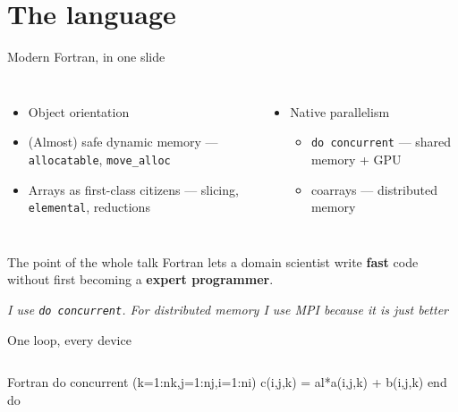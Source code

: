 \documentclass[aspectratio=169]{beamer}
\begin{document}
\section{The language}

\begin{frame}{Modern Fortran, in one slide}
  \begin{columns}[T,onlytextwidth]
      \begin{itemize}
        \item Object orientation 
        \item (Almost) safe dynamic memory --- \texttt{allocatable}, \texttt{move\_alloc}
        \item Arrays as first-class citizens --- slicing, \texttt{elemental}, reductions
      \end{itemize}
      \begin{itemize}
        \item Native parallelism 
          \begin{itemize}
            \item \texttt{do concurrent} --- shared memory + GPU
            \item coarrays --- distributed memory
          \end{itemize}
      \end{itemize}
  \end{columns}
  \vfill
  \begin{exampleblock}{The point of the whole talk}
    Fortran lets a domain scientist write \textbf{fast} code without first becoming a
    \textbf{expert programmer}.
  \end{exampleblock}
  \vspace{.2em}
  {\footnotesize\itshape I use \texttt{do concurrent}. For distributed memory I use MPI because it is just better}
\end{frame}

\begin{frame}[fragile]{One loop, every device}
  \begin{columns}[T,onlytextwidth]
      \begin{cookiecode}[title=Standard Fortran]{Fortran}
do concurrent (k=1:nk,j=1:nj,i=1:ni)
  c(i,j,k) = al*a(i,j,k) + b(i,j,k)
end do
      \end{cookiecode}
  \end{columns}
  \vspace{.3em}
  
\end{frame}
\end{document}

